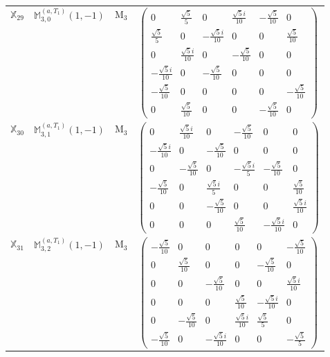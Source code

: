 \documentclass[fleqn,10pt,landscape]{article}
\begin{document}
\begin{itemize}
\begin{center}
\begin{longtable}{c|c|c|c}
$ \mathbb{X}_{29} $ & $\mathbb{M}_{3,0}^{(a,T_{1})}(1,-1)$ & M$_{3}$ & $\begin{pmatrix} 0 & \frac{\sqrt{5}}{5} & 0 & \frac{\sqrt{5} i}{10} & - \frac{\sqrt{5}}{10} & 0 \\ \frac{\sqrt{5}}{5} & 0 & - \frac{\sqrt{5} i}{10} & 0 & 0 & \frac{\sqrt{5}}{10} \\ 0 & \frac{\sqrt{5} i}{10} & 0 & - \frac{\sqrt{5}}{10} & 0 & 0 \\ - \frac{\sqrt{5} i}{10} & 0 & - \frac{\sqrt{5}}{10} & 0 & 0 & 0 \\ - \frac{\sqrt{5}}{10} & 0 & 0 & 0 & 0 & - \frac{\sqrt{5}}{10} \\ 0 & \frac{\sqrt{5}}{10} & 0 & 0 & - \frac{\sqrt{5}}{10} & 0 \end{pmatrix}$ \\
$ \mathbb{X}_{30} $ & $\mathbb{M}_{3,1}^{(a,T_{1})}(1,-1)$ & M$_{3}$ & $\begin{pmatrix} 0 & \frac{\sqrt{5} i}{10} & 0 & - \frac{\sqrt{5}}{10} & 0 & 0 \\ - \frac{\sqrt{5} i}{10} & 0 & - \frac{\sqrt{5}}{10} & 0 & 0 & 0 \\ 0 & - \frac{\sqrt{5}}{10} & 0 & - \frac{\sqrt{5} i}{5} & - \frac{\sqrt{5}}{10} & 0 \\ - \frac{\sqrt{5}}{10} & 0 & \frac{\sqrt{5} i}{5} & 0 & 0 & \frac{\sqrt{5}}{10} \\ 0 & 0 & - \frac{\sqrt{5}}{10} & 0 & 0 & \frac{\sqrt{5} i}{10} \\ 0 & 0 & 0 & \frac{\sqrt{5}}{10} & - \frac{\sqrt{5} i}{10} & 0 \end{pmatrix}$ \\
$ \mathbb{X}_{31} $ & $\mathbb{M}_{3,2}^{(a,T_{1})}(1,-1)$ & M$_{3}$ & $\begin{pmatrix} - \frac{\sqrt{5}}{10} & 0 & 0 & 0 & 0 & - \frac{\sqrt{5}}{10} \\ 0 & \frac{\sqrt{5}}{10} & 0 & 0 & - \frac{\sqrt{5}}{10} & 0 \\ 0 & 0 & - \frac{\sqrt{5}}{10} & 0 & 0 & \frac{\sqrt{5} i}{10} \\ 0 & 0 & 0 & \frac{\sqrt{5}}{10} & - \frac{\sqrt{5} i}{10} & 0 \\ 0 & - \frac{\sqrt{5}}{10} & 0 & \frac{\sqrt{5} i}{10} & \frac{\sqrt{5}}{5} & 0 \\ - \frac{\sqrt{5}}{10} & 0 & - \frac{\sqrt{5} i}{10} & 0 & 0 & - \frac{\sqrt{5}}{5} \end{pmatrix}$ \\

\end{longtable}
\end{center}
\end{itemize}
\end{document}

